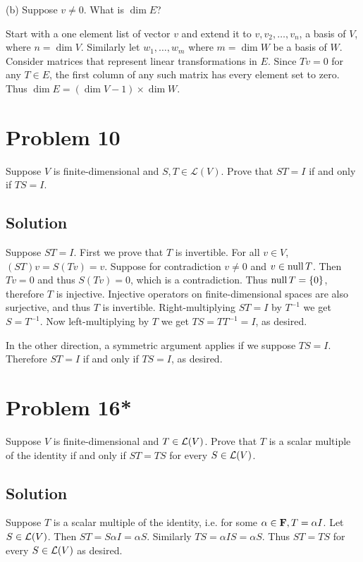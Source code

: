 \documentclass{article}
\begin{document}
\vs

(b) Suppose $v\neq 0$. What is $\dim E$?

Start with a one element list of vector $v$ and extend it to $v, v_2,\ldots,v_n$, a basis of $V$, where $n=\dim V$. Similarly let $w_1,\ldots,w_m$ where $m=\dim W$ be a basis of $W$. Consider matrices that represent linear transformations in $E$. Since $Tv=0$ for any $T\in E$, the first column of any such matrix has every element set to zero. Thus $\dim E=(\dim V-1)\times\dim W$.

\section*{Problem 10}
Suppose $V$ is finite-dimensional and $S,T\in\mathcal{L}(V)$. Prove that $ST=I$ if and only if $TS=I$.

\subsection*{Solution}
Suppose $ST=I$. First we prove that $T$ is invertible. For all $v\in V$, $(ST)v=S(Tv)=v$. Suppose for contradiction $v\neq 0$ and $v\in\text{null}\, T$. Then $Tv=0$ and thus $S(Tv)=0$, which is a contradiction. Thus $\text{null}\, T=\{0\}$, therefore $T$ is injective. Injective operators on finite-dimensional spaces are also surjective, and thus $T$ is invertible. Right-multiplying $ST=I$ by $T^{-1}$ we get $S=T^{-1}$. Now left-multiplying by $T$ we get $TS=TT^{-1}=I$, as desired.

\vs

In the other direction, a symmetric argument applies if we suppose $TS=I$. Therefore $ST=I$ if and only if $TS=I$, as desired.

\section*{Problem 16*}
Suppose $V$ is finite-dimensional and $T\in\Lo(V)$. Prove that $T$ is a scalar multiple of the identity if and only if $ST=TS$ for every $S\in\Lo(V)$.

\subsection*{Solution}
Suppose $T$ is a scalar multiple of the identity, i.e. for some $\alpha\in\mathbf{F}, T=\alpha I$. Let $S\in\Lo(V)$. Then $ST=S\alpha I=\alpha S$. Similarly $TS=\alpha I S=\alpha S$. Thus $ST=TS$ for every $S\in\Lo(V)$ as desired.
\end{document}
